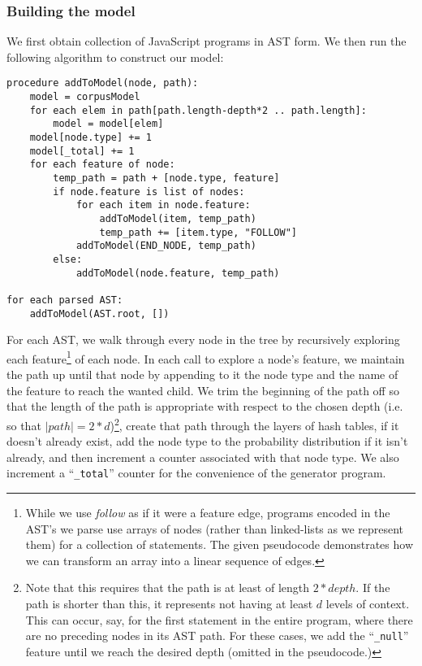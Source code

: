 \documentclass{article}
\begin{document}
\subsubsection{Building the model}

We first obtain collection of JavaScript programs in AST form. We then run the following algorithm to construct our model:

\begin{verbatim}
procedure addToModel(node, path):
    model = corpusModel
    for each elem in path[path.length-depth*2 .. path.length]:
        model = model[elem]
    model[node.type] += 1
    model[_total] += 1
    for each feature of node:
        temp_path = path + [node.type, feature]
        if node.feature is list of nodes:
            for each item in node.feature:
                addToModel(item, temp_path)
                temp_path += [item.type, "FOLLOW"]
            addToModel(END_NODE, temp_path)
        else:
            addToModel(node.feature, temp_path)

for each parsed AST:
    addToModel(AST.root, [])
\end{verbatim}

For each AST, we walk through every node in the tree by recursively exploring each feature\footnote{While we use \emph{follow} as if it were a feature edge, programs encoded in the AST's we parse use arrays of nodes (rather than linked-lists as we represent them) for a collection of statements. The given pseudocode demonstrates how we can transform an array into a linear sequence of edges.} of each node. In each call to explore a node's feature, we maintain the path up until that node by appending to it the node type and the name of the feature to reach the wanted child. We trim the beginning of the path off so that the length of the path is appropriate with respect to the chosen depth (i.e. so that $|path| = 2*d$)\footnote{Note that this requires that the path is at least of length $2*depth$. If the path is shorter than this, it represents not having at least $d$ levels of context. This can occur, say, for the first statement in the entire program, where there are no preceding nodes in its AST path. For these cases, we add the ``{\tt \_null}'' feature until we reach the desired depth (omitted in the pseudocode.)}, create that path through the layers of hash tables, if it doesn't already exist, add the node type to the probability distribution if it isn't already, and then increment a counter associated with that node type. We also increment a ``{\tt \_total}'' counter for the convenience of the generator program.
\end{document}
